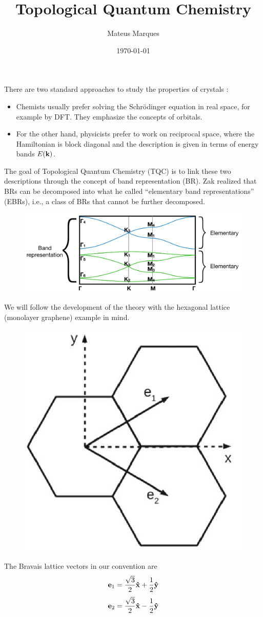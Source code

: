 \documentclass[10pt,aspectratio=169,xcolor={table,dvipsnames}]{beamer}
\title[Topological Quantum Chemistry]{\LARGE{Topological Quantum Chemistry}}
\author[Mateus Marques]{
\large{Mateus Marques
}}
\date{\today}
\begin{document}
\begin{frame}
  \titlepage
\end{frame}


\begin{frame}

There are two standard approaches to study the properties of crystals \cite{tms17}:

\n

\begin{itemize}
\item Chemists usually prefer solving the Schrödinger equation in real space, for example by DFT. They emphasize the concepts of orbitals.
\item For the other hand, physicists prefer to work on reciprocal space, where the Hamiltonian is block diagonal and the description is given in terms of energy bands $E({\vb{k}})$.
\end{itemize}

The goal of Topological Quantum Chemistry (TQC) is to link these two descriptions through the concept of band representation (BR). Zak \cite{zak1981} realized that BRs can be decomposed into what he called ``elementary band representations'' (EBRs), i.e., a class of BRs that cannot be further decomposed.
\begin{figure}[H]
\centering
\includegraphics[width=0.7\linewidth]{fig/ebrs.png}
\end{figure}


\end{frame}

\begin{frame}
We will follow the development of the theory with the hexagonal lattice (monolayer graphene) example in mind.
\begin{figure}[H]
\centering
\includegraphics[width=0.25\linewidth]{fig/hexagonal_frame.png}
\end{figure}

The Bravais lattice vectors in our convention are
$$
\vb{e}_1 = \frac{\sqrt{3}}{2} \vu{x} + \frac{1}{2} \vu{y}
$$
$$
\vb{e}_2 = \frac{\sqrt{3}}{2} \vu{x} - \frac{1}{2} \vu{y}
$$
\end{frame}
\end{document}
